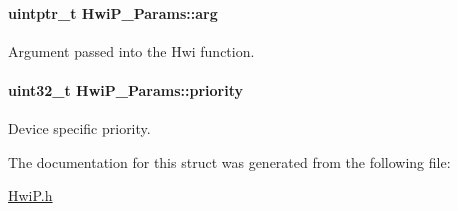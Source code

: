 \paragraph[{arg}]{\setlength{\rightskip}{0pt plus 5cm}uintptr\+\_\+t Hwi\+P\+\_\+\+Params\+::arg}\label{struct_hwi_p___params_ae59e7df38314177a3817f11cfad0ce26}
Argument passed into the Hwi function. 
\paragraph[{priority}]{\setlength{\rightskip}{0pt plus 5cm}uint32\+\_\+t Hwi\+P\+\_\+\+Params\+::priority}\label{struct_hwi_p___params_ac4977525e0bda265e8bbe2980dc16eda}
Device specific priority. 

The documentation for this struct was generated from the following file\+:\begin{DoxyCompactItemize}
\item 
\hyperlink{_hwi_p_8h}{Hwi\+P.\+h}\end{DoxyCompactItemize}
